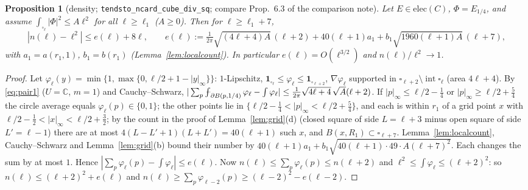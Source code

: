 \documentclass[11pt]{article}
\newtheorem{proposition}[theorem]{Proposition}
\theoremstyle{definition}
\theoremstyle{remark}
\newcommand{\C}{\mathbb C}
\newcommand{\avg}{\fint}
\def\fint{\mathop{\,\rlap{--}\!\!\int}\nolimits}
\begin{document}
\begin{proposition}[density; \texttt{tendsto\_ncard\_cube\_div\_sq}; compare Prop.~6.3 of the comparison note]\label{prop:density}
Let $E\in\mathrm{elec}(C)$, $\Phi=E_{1/4}$, and assume $\int_{\square_\ell}|\Phi|^2\le A\ell^2$ for all $\ell\ge\ell_1$ ($A\ge0$). Then for $\ell\ge\ell_1+7$,
\[
|n(\ell)-\ell^2|\le e(\ell)+8\ell,\qquad e(\ell):=\tfrac1{2\pi}\sqrt{(4\ell+4)A}\,(\ell+2)+40(\ell+1)a_1+b_1\sqrt{1960(\ell+1)A}\,(\ell+7),
\]
with $a_1=a(r_1,1)$, $b_1=b(r_1)$ (Lemma~\ref{lem:localcount}). In particular $e(\ell)=O(\ell^{3/2})$ and $n(\ell)/\ell^2\to1$.
\end{proposition}
\begin{proof}
Let $\varphi_\ell(y)=\min\{1,\max\{0,\ell/2+1-|y|_\infty\}\}$: $1$-Lipschitz, $\mathbf 1_{\square_\ell}\le\varphi_\ell\le\mathbf 1_{\square_{\ell+2}}$,
$\nabla\varphi_\ell$ supported in $\square_{\ell+2}\setminus\operatorname{int}\square_\ell$ (area $4\ell+4$).
By \eqref{eq:pair1} ($U=\C$, $m=1$) and Cauchy--Schwarz,
$|\sum_p\avg_{\partial B(p,1/4)}\varphi_\ell-\int\varphi_\ell|\le\frac1{2\pi}\sqrt{4\ell+4}\,\sqrt{A}(\ell+2)$.
If $|p|_\infty\le\ell/2-\frac14$ or $|p|_\infty\ge\ell/2+\frac54$ the circle average equals $\varphi_\ell(p)\in\{0,1\}$; the other points lie in
$\{\ell/2-\frac14<|p|_\infty<\ell/2+\frac54\}$, and each is within $r_1$ of a grid point $x$ with $\ell/2-\frac12<|x|_\infty<\ell/2+\frac32$;
by the count in the proof of Lemma~\ref{lem:grid}(d) (closed square of side $L=\ell+3$ minus open square of side $L'=\ell-1$)
there are at most $4(L-L'+1)(L+L')=40(\ell+1)$ such $x$, and $B(x,R_1)\subset\square_{\ell+7}$. Lemma~\ref{lem:localcount}, Cauchy--Schwarz and
Lemma~\ref{lem:grid}(b) bound their number by $40(\ell+1)a_1+b_1\sqrt{40(\ell+1)\cdot49\cdot A(\ell+7)^2}$. Each changes the sum by at most $1$. Hence
$|\sum_p\varphi_\ell(p)-\int\varphi_\ell|\le e(\ell)$. Now $n(\ell)\le\sum_p\varphi_\ell(p)\le n(\ell+2)$ and $\ell^2\le\int\varphi_\ell\le(\ell+2)^2$: so
$n(\ell)\le(\ell+2)^2+e(\ell)$ and $n(\ell)\ge\sum_p\varphi_{\ell-2}(p)\ge(\ell-2)^2-e(\ell-2)$.
\end{proof}
\end{document}
